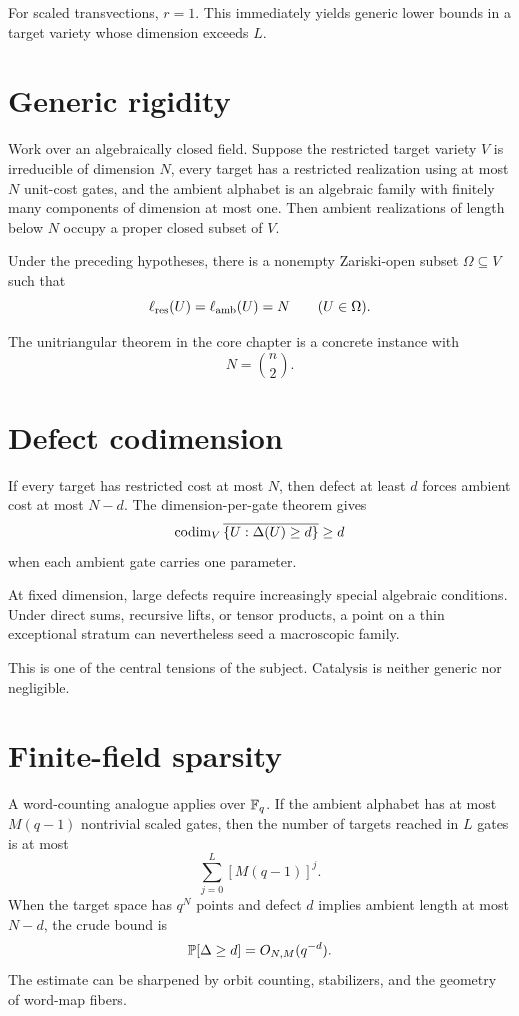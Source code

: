 For scaled transvections, $r=1$.  This immediately yields generic lower bounds in a target variety whose dimension exceeds $L$.

\section{Generic rigidity}
Work over an algebraically closed field.  Suppose the restricted target variety $V$ is irreducible of dimension $N$, every target has a restricted realization using at most $N$ unit-cost gates, and the ambient alphabet is an algebraic family with finitely many components of dimension at most one.  Then ambient realizations of length below $N$ occupy a proper closed subset of $V$.

\begin{theorem}
Under the preceding hypotheses, there is a nonempty Zariski-open subset $\Omega\subseteq V$ such that
\[
\ell_{\mathrm{res}}(U)=\ell_{\mathrm{amb}}(U)=N
\qquad(U\in\Omega).
\]
\end{theorem}
The unitriangular theorem in the core chapter is a concrete instance with
\[
N=\binom n2.
\]

\section{Defect codimension}
If every target has restricted cost at most $N$, then defect at least $d$ forces ambient cost at most $N-d$.  The dimension-per-gate theorem gives
\[
\operatorname{codim}_V\overline{\{U:\Delta(U)\ge d\}}
\ge d
\]
when each ambient gate carries one parameter.

\begin{principle}
At fixed dimension, large defects require increasingly special algebraic conditions.  Under direct sums, recursive lifts, or tensor products, a point on a thin exceptional stratum can nevertheless seed a macroscopic family.
\end{principle}

This is one of the central tensions of the subject.  Catalysis is neither generic nor negligible.

\section{Finite-field sparsity}
A word-counting analogue applies over $\mathbb F_q$.  If the ambient alphabet has at most $M(q-1)$ nontrivial scaled gates, then the number of targets reached in $L$ gates is at most
\[
\sum_{j=0}^L[M(q-1)]^j.
\]
When the target space has $q^N$ points and defect $d$ implies ambient length at most $N-d$, the crude bound is
\[
\mathbb P[\Delta\ge d]
=O_{N,M}(q^{-d}).
\]
The estimate can be sharpened by orbit counting, stabilizers, and the geometry of word-map fibers.

